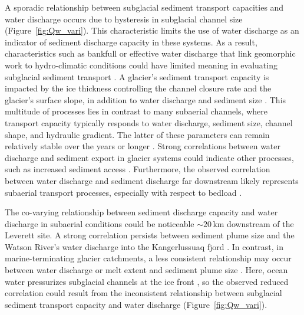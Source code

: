 \documentclass[esurf, manuscript]{copernicus}
\begin{document}
A sporadic relationship between subglacial sediment transport capacities and water discharge occurs due to hysteresis in subglacial channel size (Figure~\ref{fig:Qw_vari}).
This characteristic limits the use of water discharge as an indicator of sediment discharge capacity in these systems.
As a result, characteristics such as bankfull or effective water discharge that link geomorphic work to hydro-climatic conditions could have limited meaning in evaluating subglacial sediment transport \citep{wolman1960,lenzi2006}.
A glacier's sediment transport capacity is impacted by the ice thickness controlling the channel closure rate and the glacier's surface slope, in addition to water discharge and sediment size \citep[Figure~\ref{fig:multi_run}, Section~\ref{sect:sub_mode}; ][]{rothlisberger1972,gimbert2016,stevens2022,walder1994}.
This multitude of processes lies in contrast to many subaerial channels, where transport capacity typically responds to water discharge, sediment size, channel shape,  and hydraulic gradient.
The latter of these parameters can remain relatively stable over the years or longer \citep[Section~\ref{sect:fluv}; e.g.][]{tucker1997}.
Strong correlations between water discharge and sediment export in glacier systems could indicate other processes, such as increased sediment access \citep{zhang2022}.
Furthermore, the observed correlation between water discharge and sediment discharge far downstream likely represents subaerial transport processes, especially with respect to bedload \citep{mancini2023}.

The co-varying relationship between sediment discharge capacity and water discharge in subaerial conditions could be noticeable $\sim20$\,\unit{km} downstream of the Leverett site.
A strong correlation persists between sediment plume size and the Watson River's water discharge into the Kangerlussuaq fjord \citep{chu2009,mcgrath2010}.
In contrast, in marine-terminating glacier catchments, a less consistent relationship may occur between water discharge or melt extent and sediment plume size \citep{chu2012,tedstone2012}.
Here, ocean water pressurizes subglacial channels at the ice front \citep[e.g.][]{how2017}, so the observed reduced correlation could result from the inconsistent relationship between subglacial sediment transport capacity and water discharge (Figure~\ref{fig:Qw_vari}).
\end{document}
